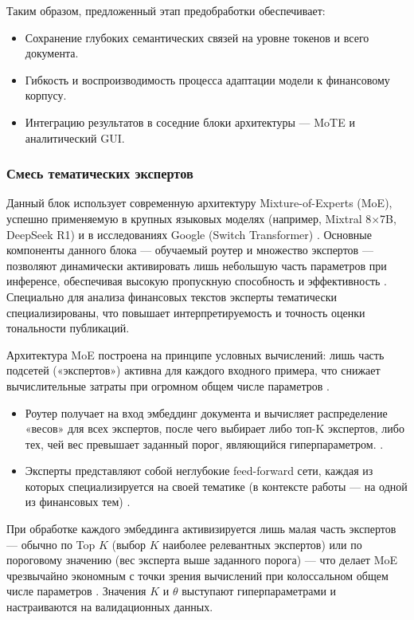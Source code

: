 Таким образом, предложенный этап предобработки обеспечивает:

\begin{itemize}
    \item Сохранение глубоких семантических связей на уровне токенов и всего документа.
    \item Гибкость и воспроизводимость процесса адаптации модели к финансовому корпусу.
    \item Интеграцию результатов в соседние блоки архитектуры --- MoTE и аналитический GUI.
\end{itemize}

\subsubsection{Смесь тематических экспертов}

Данный блок использует современную архитектуру Mixture-of-Experts (MoE), успешно применяемую в крупных
языковых моделях (например, Mixtral 8×7B, DeepSeek R1) и в исследованиях Google (Switch Transformer) \parencite{fedus2022switch}.
Основные компоненты данного блока --- обучаемый роутер и множество экспертов --- позволяют динамически активировать
лишь небольшую часть параметров при инференсе, обеспечивая высокую пропускную способность и эффективность
\parencite{shazeer2017outrageously}. Специально для анализа финансовых текстов эксперты тематически
специализированы, что повышает интерпретируемость и точность оценки тональности публикаций.

Архитектура MoE построена на принципе условных вычислений: лишь часть подсетей («экспертов») активна
для каждого входного примера, что снижает вычислительные затраты при огромном общем числе параметров
\parencite{shazeer2017outrageously}.


\begin{itemize}
    \item Роутер получает на вход эмбеддинг документа и вычисляет распределение «весов» для всех экспертов,
    после чего выбирает либо топ-K экспертов, либо тех, чей вес превышает заданный порог, являющийся гиперпараметром.
    \parencite{fedus2022switch}.
    \item Эксперты представляют собой неглубокие feed-forward сети, каждая из которых специализируется на своей
    тематике (в контексте работы --- на одной из финансовых тем) \parencite{shazeer2017outrageously}.
\end{itemize}

При обработке каждого эмбеддинга активизируется лишь малая часть экспертов --- обычно по Top $K$
(выбор $K$ наиболее релевантных экспертов) или по пороговому значению (вес эксперта выше заданного порога) ---
что делает MoE чрезвычайно экономным с точки зрения вычислений при колоссальном общем числе параметров \parencite{fedus2022switch}.
Значения $K$ и $\theta$ выступают гиперпараметрами и настраиваются на валидационных данных.

